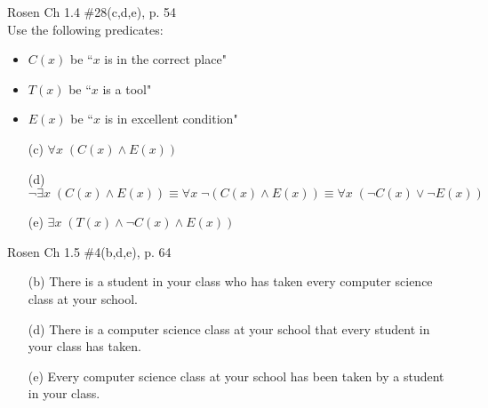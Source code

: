\documentclass[12pt,addpoints]{exam}
\newcommand{\ra}{\rightarrow}
\begin{document}
\begin{questions}
\question Rosen Ch 1.4 \#28(c,d,e), p. 54 \\
Use the following predicates:
\begin{itemize}[itemsep=0pt,parsep=0pt,topsep=0pt,partopsep=0pt]
    \item $C(x)$ be ``$x$ is in the correct place"
    \item $T(x)$ be ``$x$ is a tool"
    \item $E(x)$ be ``$x$ is in excellent condition"
\end{itemize}
    \ifprintanswers
        \vspace{-10pt}
    \fi
\begin{solution}
    \begin{itemize}[itemsep=0pt,parsep=0pt,topsep=0pt,partopsep=0pt]
        \item[(c)] $\forall x\; (C(x) \wedge E(x)) $
        \item[(d)] $\neg \exists x\; (C(x) \wedge E(x)) \equiv \forall x\; \neg (C(x) \wedge E(x)) \equiv \forall x\; (\neg C(x) \vee \neg E(x))$
        \item[(e)] $\exists x\; (T(x) \wedge \neg C(x) \wedge E(x))$
    \end{itemize}
\end{solution}


\question Rosen Ch 1.5 \#4(b,d,e), p. 64
    \ifprintanswers
        \vspace{-10pt}
    \fi
\begin{solution}
    \begin{itemize}[itemsep=0pt,parsep=0pt,topsep=0pt,partopsep=0pt]
       \item[(b)] There is a student in your class who has taken every computer science class at your school.
        \item[(d)] There is a computer science class at your school that every student in your class has taken.
        \item[(e)] Every computer science class at your school has been taken by a student in your class.
    \end{itemize}
\end{solution}



\end{questions}
\end{document}

